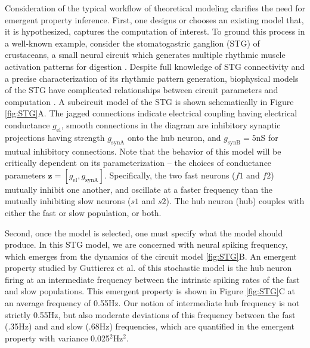 \documentclass[11pt]{article}
\begin{document}
Consideration of the typical workflow of theoretical modeling clarifies the need for emergent property inference.  
First, one designs or chooses an existing model that, it is hypothesized, captures the computation of interest. 
To ground this process in a well-known example, consider the stomatogastric ganglion (STG) of crustaceans, a small neural circuit which generates multiple rhythmic muscle activation patterns for digestion \cite{marder2002cellular}.
Despite full knowledge of STG connectivity and a precise characterization of its rhythmic pattern generation, biophysical models of the STG have complicated relationships between circuit parameters and computation \cite{goldman2001global, prinz2004similar}.
A subcircuit model of the STG \cite{gutierrez2013multiple} is shown schematically in Figure \ref{fig:STG}A.
The jagged connections indicate electrical coupling having electrical conductance $g_{\text{el}}$, smooth connections in the diagram are inhibitory synaptic projections having strength $g_{\text{synA}}$ onto the hub neuron, and $g_{\text{synB}}=5$nS for mutual inhibitory connections.
Note that the behavior of this model will be critically dependent on its parameterization -- the choices of conductance parameters $\mathbf{z} = [g_{\text{el}}, g_{\text{synA}}]$.
Specifically, the two fast neurons ($f1$ and $f2$) mutually inhibit one another, and oscillate at a faster frequency than the mutually inhibiting slow neurons ($s1$ and $s2$).  
The hub neuron (hub) couples with either the fast or slow population, or both.  

Second, once the model is selected, one must specify what the model should produce.
In this STG model, we are concerned with neural spiking frequency, which emerges from the dynamics of the circuit model \ref{fig:STG}B.
An emergent property studied by Guttierez et al. of this stochastic model is the hub neuron firing at an intermediate frequency between the intrinsic spiking rates of the fast and slow populations.
This emergent property is shown in Figure \ref{fig:STG}C at an average frequency of 0.55Hz.
Our notion of intermediate hub frequency is not strictly 0.55Hz, but also moderate deviations of this frequency between the fast (.35Hz) and and slow (.68Hz) frequencies, which are quantified in the emergent property with variance {0.025$^2$Hz$^2$}.
\end{document}
